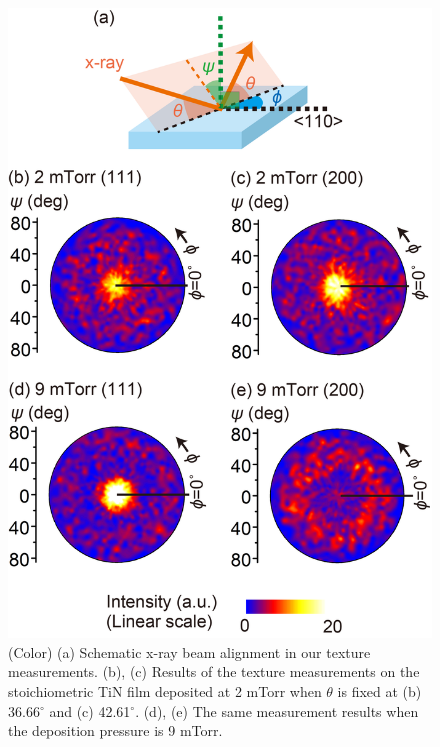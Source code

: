 \documentclass{report}
\begin{document}
\begin{figure}
\begin{center}
\includegraphics{Texture.jpg}
\end{center}
\caption{(Color) (a) Schematic x-ray beam alignment in our texture measurements. (b), (c) Results of the texture measurements on the stoichiometric TiN film deposited at 2 mTorr when $\theta$ is fixed at (b) 36.66$^{\circ}$ and (c) 42.61$^{\circ}$. (d), (e) The same measurement results when the deposition pressure is 9 mTorr.}
\label{Texture}
\end{figure}
\end{document}
